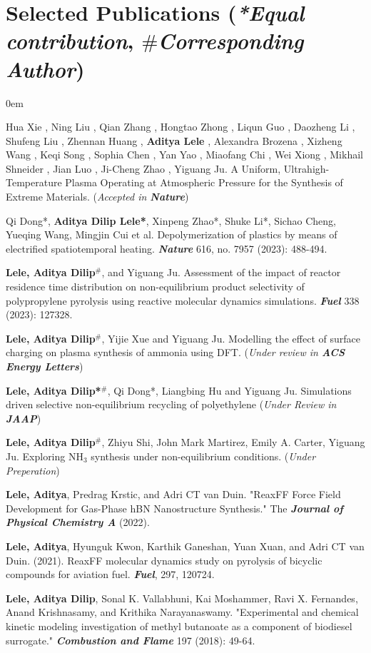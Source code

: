 \documentclass[letterpaper,10pt]{article}
\begin{document}
	\section{Selected Publications 	(\small{\textit{*Equal contribution}},
		\small{\textit{$\#$Corresponding Author}}) }
	\begin{etaremune}%
		\itemsep0em 
		\item Hua Xie , Ning Liu , Qian Zhang , Hongtao Zhong , Liqun Guo , Daozheng Li , Shufeng Liu , Zhennan Huang , \textbf{Aditya Lele} , Alexandra Brozena , Xizheng Wang , Keqi Song , Sophia Chen , Yan Yao , Miaofang Chi , Wei Xiong , Mikhail Shneider , Jian Luo , Ji-Cheng Zhao , Yiguang Ju.  	A Uniform, Ultrahigh-Temperature Plasma Operating at Atmospheric Pressure for the Synthesis of Extreme Materials.  (\textit{Accepted in \textbf{Nature}})		
		\item Qi Dong*, \textbf{Aditya Dilip Lele*}, Xinpeng Zhao*, Shuke Li*, Sichao Cheng, Yueqing Wang, Mingjin Cui et al. Depolymerization of plastics by means of electrified spatiotemporal heating. \textbf{\textit{Nature}} 616, no. 7957 (2023): 488-494.
		\item \textbf{Lele, Aditya Dilip$^\#$}, and Yiguang Ju. Assessment of the impact of reactor residence time distribution on non-equilibrium product selectivity of polypropylene pyrolysis using reactive molecular dynamics simulations. \textbf{\textit{Fuel}} 338 (2023): 127328.
		\item \textbf{Lele, Aditya Dilip$^\#$}, Yijie Xue and Yiguang Ju.  Modelling the effect of surface charging on plasma synthesis of ammonia using DFT. (\textit{Under review in \textbf{ACS Energy Letters}})
		\item \textbf{Lele, Aditya Dilip*$^\#$}, Qi Dong*, Liangbing Hu and Yiguang Ju.  Simulations driven selective non-equilibrium recycling of polyethylene (\textit{Under Review in \textbf{JAAP}})		
		\item \textbf{Lele, Aditya Dilip$^\#$}, Zhiyu Shi, John Mark Martirez, Emily A. Carter, Yiguang Ju. Exploring NH$_3$ synthesis under non-equilibrium conditions. (\textit{Under Preperation})
		\item \textbf{Lele, Aditya}, Predrag Krstic, and Adri CT van Duin. "ReaxFF Force Field Development for Gas-Phase hBN Nanostructure Synthesis." The \textbf{\textit{Journal of Physical Chemistry A}} (2022).
		\item \textbf{Lele, Aditya}, Hyunguk Kwon, Karthik Ganeshan, Yuan Xuan, and Adri CT van Duin. (2021). ReaxFF molecular dynamics study on pyrolysis of bicyclic compounds for aviation fuel. \textbf{\textit{Fuel}}, 297, 120724.
		\item \textbf{Lele, Aditya Dilip}, Sonal K. Vallabhuni, Kai Moshammer, Ravi X. Fernandes, Anand Krishnasamy, and Krithika Narayanaswamy. "Experimental and chemical kinetic modeling investigation of methyl butanoate as a component of biodiesel surrogate." \textit{\textbf{Combustion and Flame}} 197 (2018): 49-64.
	\end{etaremune}
\end{document}
